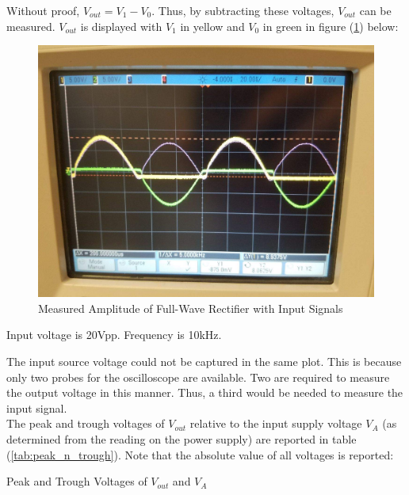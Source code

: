 \FloatBarrier

Without proof, $V_{out} = V_1 - V_0$. Thus, by subtracting these voltages, $V_{out}$ can be measured. $V_{out}$ is displayed with $V_1$ in yellow and $V_0$ in green in figure (\ref{fig:measured_fwr_with_inputs}) below:

\FloatBarrier

\begin{figure}[h!]
	\centering
	\includegraphics[scale=0.25]{./images/full_wave_rectifier.PNG}
	\caption{Measured Amplitude of Full-Wave Rectifier with Input Signals}
	\label{fig:measured_fwr_with_inputs}
\end{figure}

\FloatBarrier

{\footnotesize Input voltage is 20\si{\volt}pp. Frequency is 10\si{\kilo\hertz}.}

\FloatBarrier

The input source voltage could not be captured in the same plot. This is because only two probes for the oscilloscope are available. Two are required to measure the output voltage in this manner. Thus, a third would be needed to measure the input signal. \\

The peak and trough voltages of $V_{out}$ relative to the input supply voltage $V_{A}$ (as determined from the reading on the power supply) are reported in table (\ref{tab:peak_n_trough}). Note that the absolute value of all voltages is reported:

\FloatBarrier

\begin{table}[h!]
	\centering
	\caption{Peak and Trough Voltages of $V_{out}$ and $V_{A}$}
	\label{tab:peak_n_trough}
\end{table}


